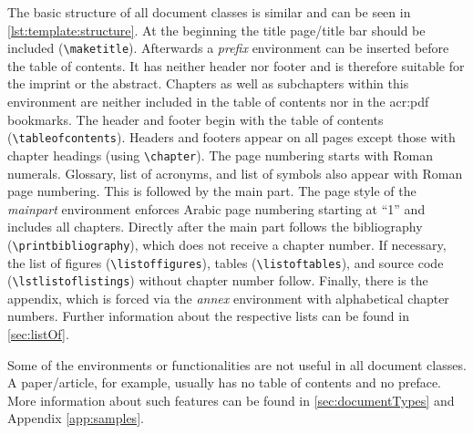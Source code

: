 The basic structure of all document classes is similar and can be seen in \autoref{lst:template:structure}. At the beginning the title page/title bar should be included (\lstinline|\maketitle|). Afterwards a \textit{prefix} environment can be inserted before the table of contents. %
It has neither header nor footer and is therefore suitable for the imprint or the abstract. Chapters as well as subchapters within this environment are neither included in the table of contents nor in the \acs{acr:pdf} bookmarks. The header and footer begin with the table of contents (\lstinline|\tableofcontents|). Headers and footers appear on all pages except those with chapter headings (using \lstinline|\chapter|). The page numbering starts with Roman numerals. Glossary, list of acronyms, and list of symbols also appear with Roman page numbering. This is followed by the main part. The page style of the \textit{mainpart} environment enforces Arabic page numbering starting at \enquote{1} and includes all chapters. Directly after the main part follows the bibliography (\lstinline|\printbibliography|), which does not receive a chapter number. If necessary, the list of figures (\lstinline|\listoffigures|), tables (\lstinline|\listoftables|), and source code (\lstinline|\lstlistoflistings|) without chapter number follow. Finally, there is the appendix, which is forced via the \textit{annex} environment with alphabetical chapter numbers. Further information about the respective lists can be found in \autoref{sec:listOf}.

Some of the environments or functionalities are not useful in all document classes. A paper/article, for example, usually has no table of contents and no preface. More information about such features can be found in \autoref{sec:documentTypes} and Appendix \ref{app:samples}.

